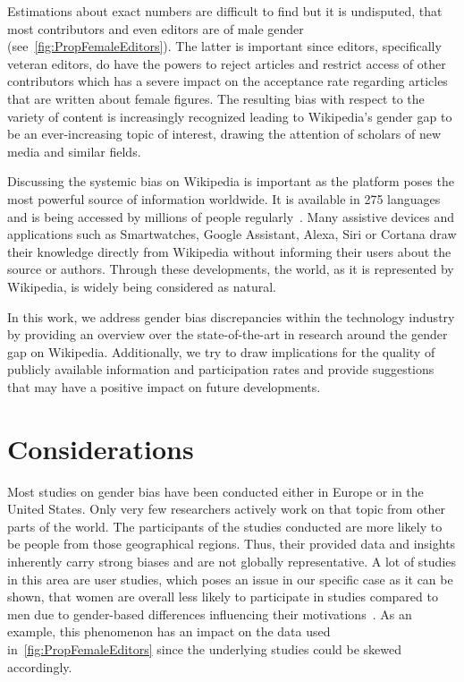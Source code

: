 \documentclass[a4paper, 11pt]{article}
\begin{document}
Estimations about exact numbers are difficult to find but it is undisputed, that most contributors and even editors are of male gender (see~\autoref{fig:PropFemaleEditors}). The latter is important since editors, specifically veteran editors, do have the powers to reject articles and restrict access of other contributors which has a severe impact on the acceptance rate regarding articles that are written about female figures. The resulting bias with respect to the variety of content is increasingly recognized leading to Wikipedia’s gender gap to be an ever-increasing topic of interest, drawing the attention of scholars of new media and similar fields.

Discussing the systemic bias on Wikipedia is important as the platform poses the most powerful source of information worldwide. It is available in 275 languages and is being accessed by millions of people regularly~\cite{zachte2018}. Many assistive devices and applications such as Smartwatches, Google Assistant, Alexa, Siri or Cortana draw their knowledge directly from Wikipedia without informing their users about the source or authors. Through these developments, the world, as it is represented by Wikipedia, is widely being considered as natural.


In this work, we address gender bias discrepancies within the technology industry by providing an overview over the state-of-the-art in research around the gender gap on Wikipedia. Additionally, we try to draw implications for the quality of publicly available information and participation rates and provide suggestions that may have a positive impact on future developments.

\section{Considerations} \label{sec:considerations}
Most studies on gender bias have been conducted either in Europe or in the United States. Only very few researchers actively work on that topic from other parts of the world. The participants of the studies conducted are more likely to be people from those geographical regions. Thus, their provided data and insights inherently carry strong biases and are not globally representative. A lot of studies in this area are user studies, which poses an issue in our specific case as it can be shown, that women are overall less likely to participate in studies compared to men due to gender-based differences influencing their motivations~\cite{lobato2014impact}. As an example, this phenomenon has an impact on the data used in~\autoref{fig:PropFemaleEditors} since the underlying studies could be skewed accordingly.
\end{document}
